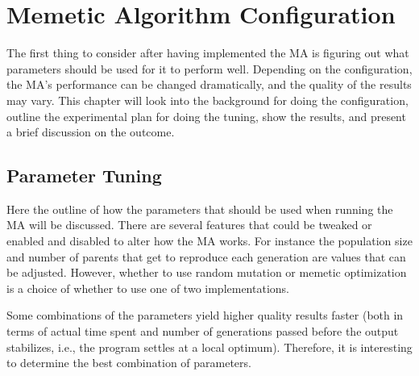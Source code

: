 \chapter{Memetic Algorithm Configuration} %
\label{cha:evolutionary_algorithm_configuration}

The first thing to consider after having implemented the MA is figuring out what parameters should be used for it to perform well. Depending on the configuration, the MA's performance can be changed dramatically, and the quality of the results may vary. This chapter will look into the background for doing the configuration, outline the experimental plan for doing the tuning, show the results, and present a brief discussion on the outcome.

\section{Parameter Tuning} %
\label{sec:background_and_motivation}
Here the outline of how the parameters that should be used when running the MA will be discussed. There are several features that could be tweaked or enabled and disabled to alter how the MA works. For instance the population size and number of parents that get to reproduce each generation are values that can be adjusted. However, whether to use random mutation or memetic optimization is a choice of whether to use one of two implementations.

Some combinations of the parameters yield higher quality results faster (both in terms of actual time spent and number of generations passed before the output stabilizes, i.e., the program settles at a local optimum). Therefore, it is interesting to determine the best combination of parameters.

